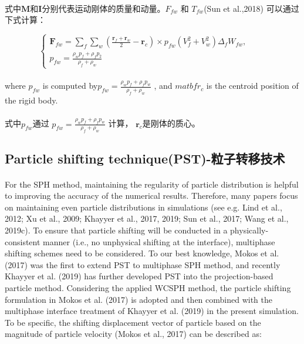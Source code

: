 \documentclass[UTF8]{ctexart}
\begin{document}
\paragraph{\quad}式中$\mathbf{M}$和$\mathbf{I}$分别代表运动刚体的质量和动量。$F_{fw}$ 和 $T_{fw}$(Sun et al.,2018)
                可以通过下式计算：

\begin{equation}
   \begin{cases} \mathbf{F}_{fw} = \sum_{f}\sum_{w}(\frac{\mathbf{r}_f+\mathbf{r}_w}{2}-\mathbf{r}_c)\times p_{fw}(V_f^2+V_w^2)\Delta_f W_{fw}, \\
   p_{fw}=\frac{\rho_w p_f+\rho_f p_2}{\rho_f+\rho_w} \end{cases} \qquad 
\end{equation}

\paragraph{\quad}where $p_{fw}$ is computed by$ p_{fw} = \frac{\rho_w p_f +\rho_f p_w}{ \rho_f +\rho_w}$ , 
                and $matbf{r}_c$ is the centroid position of the rigid body.
\paragraph{\quad}式中$p_{fw}$通过 $ p_{fw} = \frac{\rho_w p_f +\rho_f p_w}{ \rho_f +\rho_w}$ 计算，
                $\mathbf{r}_c$是刚体的质心。

\subsection{Particle shifting technique(PST)-粒子转移技术}
\paragraph{\quad}For the SPH method, maintaining the regularity 
                of particle distribution is helpful to improving 
                the accuracy of the numerical results. Therefore, 
                many papers focus on maintaining even particle 
                distributions in simulations 
                (see e.g. Lind et al., 2012; Xu et al., 2009; Khayyer et al., 2017, 2019; Sun et al., 2017; Wang et al., 2019c). 
                To ensure that particle shifting will be conducted in 
                a physically-consistent manner (i.e., no unphysical shifting at the interface), 
                multiphase shifting schemes need to be considered. 
                To our best knowledge, Mokos et al. (2017) was the first 
                to extend PST to multiphase SPH method, and recently Khayyer 
                et al. (2019) has further developed PST into the projection-based 
                particle method. Considering the applied WCSPH method, 
                the particle shifting formulation in Mokos et al. (2017) 
                is adopted and then combined with the multiphase interface 
                treatment of Khayyer et al. (2019) in the present simulation. 
                To be specific, the shifting displacement vector of particle 
                based on the magnitude of particle velocity (Mokos et al., 2017) 
                can be described as:
\end{document}
